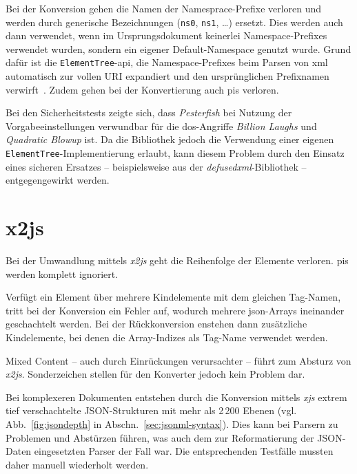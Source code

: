 Bei der Konversion gehen die Namen der Namesprace-Prefixe verloren und werden durch generische Bezeichnungen (\texttt{ns0}, \texttt{ns1}, \dots{}) ersetzt. Dies werden auch dann verwendet, wenn im Ursprungsdokument keinerlei Namespace-Prefixes verwendet wurden, sondern ein eigener Default-Namespace genutzt wurde. Grund dafür ist die \texttt{Element}\-\texttt{Tree}-\acrshort{api}, die Namespace-Prefixes beim Parsen von \acrshort{xml} automatisch zur vollen URI expandiert und den ursprünglichen Prefixnamen verwirft~\cite[Abschn.~20.5.1.7]{pythonetreexmlns}.
Zudem gehen bei der Konvertierung auch \glspl{pi} verloren.

Bei den Sicherheitstests zeigte sich, dass \emph{Pesterfish} bei Nutzung der Vorgabeeinstellungen verwundbar für die \acrshort{dos}-Angriffe \emph{Billion Laughs} und \emph{Quadratic Blowup} ist. Da die Bibliothek jedoch die Verwendung einer eigenen \texttt{ElementTree}-Implementierung erlaubt, kann diesem Problem durch den Einsatz eines sicheren Ersatzes -- beispielsweise aus der \emph{defusedxml}-Bibliothek -- entgegengewirkt werden.

\section{x2js}
\label{sec:x2js}

Bei der Umwandlung mittels \emph{x2js} geht die Reihenfolge der Elemente verloren. \glspl{pi} werden komplett ignoriert.

Verfügt ein Element über mehrere Kindelemente mit dem gleichen Tag-Namen, tritt bei der Konversion ein Fehler auf, wodurch mehrere \acrshort{json}-Arrays ineinander geschachtelt werden. Bei der Rückkonversion enstehen dann zusätzliche Kindelemente, bei denen die Array-Indizes als Tag-Name verwendet werden.

Mixed Content -- auch durch Einrückungen verursachter -- führt zum Absturz von \emph{x2js}. Sonderzeichen stellen für den Konverter jedoch kein Problem dar.

Bei komplexeren Dokumenten entstehen durch die Konversion mittels \emph{xjs} extrem tief verschachtelte JSON-Strukturen mit mehr als 2\,200 Ebenen (vgl. Abb.~\ref{fig:jsondepth} in Abschn.~\ref{sec:jsonml-syntax}). Dies kann bei Parsern zu Problemen und Abstürzen führen, was auch dem zur Reformatierung der JSON-Daten eingesetzten Parser der Fall war. Die entsprechenden Testfälle mussten daher manuell wiederholt werden.


